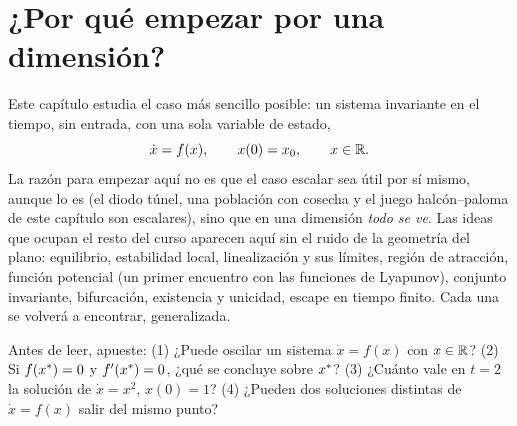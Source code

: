 \section{¿Por qué empezar por una dimensión?}
\label{sec:un-porque}

Este capítulo estudia el caso más sencillo posible: un sistema invariante en el tiempo, sin entrada, con una sola variable de estado,
\begin{equation}
  \dot x=f(x),\qquad x(0)=x_0,\qquad x\in\mathbb{R} .
  \label{eq:un-escalar}
\end{equation}
La razón para empezar aquí no es que el caso escalar sea útil por sí mismo, aunque lo es (el diodo túnel, una población con cosecha y el juego halcón--paloma de este capítulo son escalares), sino que en una dimensión \emph{todo se ve}. Las ideas que ocupan el resto del curso aparecen aquí sin el ruido de la geometría del plano: equilibrio, estabilidad local, linealización y sus límites, región de atracción, función potencial (un primer encuentro con las funciones de Lyapunov), conjunto invariante, bifurcación, existencia y unicidad, escape en tiempo finito. Cada una se volverá a encontrar, generalizada.


\begin{pausa}
Antes de leer, apueste: (1) ¿Puede oscilar un sistema $\dot x=f(x)$ con $x\in\mathbb{R}$? (2) Si $f(x^{*})=0$ y $f'(x^{*})=0$, ¿qué se concluye sobre $x^{*}$? (3) ¿Cuánto vale en $t=2$ la solución de $\dot x=x^2$, $x(0)=1$? (4) ¿Pueden dos soluciones distintas de $\dot x=f(x)$ salir del mismo punto?
\end{pausa}
